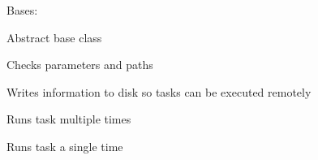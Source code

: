 \documentclass[letterpaper,10pt,english]{sphinxmanual}
\begin{document}
\begin{fulllineitems}
\label{\detokenize{ref/seisflows.system:seisflows.system.base.base}}
Bases: 

Abstract base class

\begin{fulllineitems}
\label{\detokenize{ref/seisflows.system:seisflows.system.base.base.check}}
Checks parameters and paths

\end{fulllineitems}


\begin{fulllineitems}
\label{\detokenize{ref/seisflows.system:seisflows.system.base.base.checkpoint}}
Writes information to disk so tasks can be executed remotely

\end{fulllineitems}


\begin{fulllineitems}
\label{\detokenize{ref/seisflows.system:seisflows.system.base.base.run}}
Runs task multiple times

\end{fulllineitems}


\begin{fulllineitems}
\label{\detokenize{ref/seisflows.system:seisflows.system.base.base.run_single}}
Runs task a single time


\end{fulllineitems}
\end{fulllineitems}
\end{document}
